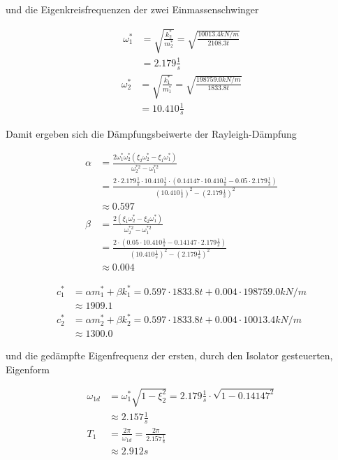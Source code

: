 und die Eigenkreisfrequenzen der zwei Einmassenschwinger

\begin{align*}
\omega_1^* &= \sqrt{\frac{k_2^*}{m_2^*}} = \sqrt{\frac{10013.4 kN/m}{2108.3 t}}\\
           &= 2.179 \frac{1}{s}
\end{align*}
\begin{align*}
\omega_2^* &= \sqrt{\frac{k_1^*}{m_1^*}} = \sqrt{\frac{198759.0 kN/m}{1833.8 t}}\\
           &= 10.410 \frac{1}{s}
\end{align*}

Damit ergeben sich die Dämpfungsbeiwerte der Rayleigh-Dämpfung

\begin{align*}
\alpha &= \frac{2 \omega_1^* \omega_2^* (\xi_2 \omega_2^* - \xi_1 \omega_1^*)}{\omega_2^{*2} - \omega_1^{*2}}\\
       &= \frac{2 \cdot 2.179 \frac{1}{s} \cdot 10.410 \frac{1}{s} \cdot (0.14147 \cdot 10.410 \frac{1}{s} - 0.05 \cdot 2.179 \frac{1}{s})}{(10.410 \frac{1}{s})^2 - (2.179 \frac{1}{s})^2}\\
       &\approx 0.597\\[2em]
\beta  &= \frac{2 (\xi_1 \omega_2^* - \xi_2 \omega_1^*)}{\omega_2^{*2} - \omega_1^{*2}}\\
       &= \frac{2 \cdot (0.05 \cdot 10.410 \frac{1}{s} - 0.14147 \cdot 2.179 \frac{1}{s})}{(10.410 \frac{1}{s})^2 - (2.179 \frac{1}{s})^2}\\
       &\approx 0.004
\end{align*}

\begin{align*}
c_1^* &= \alpha m_1^* + \beta k_1^* = 0.597 \cdot 1833.8 t + 0.004 \cdot 198759.0 kN/m\\
      &\approx 1909.1\\
c_2^* &= \alpha m_2^* + \beta k_2^* = 0.597 \cdot 1833.8 t + 0.004 \cdot 10013.4 kN/m\\
      &\approx 1300.0
\end{align*}

und die gedämpfte Eigenfrequenz der ersten, durch den Isolator gesteuerten, Eigenform  

\begin{align*}
\omega_{1d} &= \omega_1^* \sqrt{1 - \xi_2^2} = 2.179 \frac{1}{s} \cdot \sqrt{1 - 0.14147^2}\\
            &\approx 2.157 \frac{1}{s}\\
T_1         &= \frac{2 \pi}{\omega_{1d}} = \frac{2 \pi}{2.157 \frac{1}{s}}\\
            &\approx 2.912 s
\end{align*}

